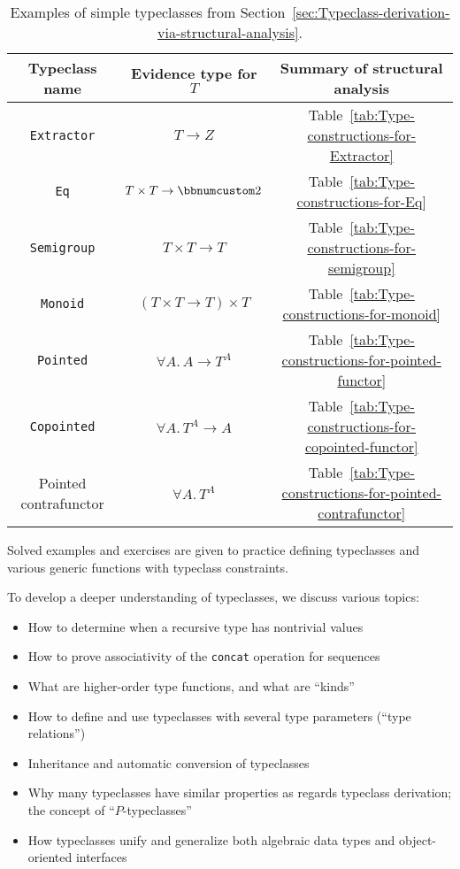 \begin{table}
\begin{centering}
\begin{tabular}{|c|c|c|}
\hline 
\textbf{\small{}Typeclass name} & \textbf{\small{}Evidence type for $T$} & \textbf{\small{}Summary of structural analysis}\tabularnewline
\hline 
\hline 
{\small{}}\lstinline!Extractor! & {\small{}$T\rightarrow Z$} & {\small{}Table~\ref{tab:Type-constructions-for-Extractor}}\tabularnewline
\hline 
{\small{}}\lstinline!Eq! & {\small{}$T\times T\rightarrow\bbnum 2$} & {\small{}Table~\ref{tab:Type-constructions-for-Eq}}\tabularnewline
\hline 
{\small{}}\lstinline!Semigroup! & {\small{}$T\times T\rightarrow T$} & {\small{}Table~\ref{tab:Type-constructions-for-semigroup}}\tabularnewline
\hline 
{\small{}}\lstinline!Monoid! & {\small{}$(T\times T\rightarrow T)\times T$} & {\small{}Table~\ref{tab:Type-constructions-for-monoid}}\tabularnewline
\hline 
{\small{}}\lstinline!Pointed! & {\small{}$\forall A.\,A\rightarrow T^{A}$} & {\small{}Table~\ref{tab:Type-constructions-for-pointed-functor}}\tabularnewline
\hline 
{\small{}}\lstinline!Copointed! & {\small{}$\forall A.\,T^{A}\rightarrow A$} & {\small{}Table~\ref{tab:Type-constructions-for-copointed-functor}}\tabularnewline
\hline 
{\small{}Pointed contrafunctor} & {\small{}$\forall A.\,T^{A}$} & {\small{}Table~\ref{tab:Type-constructions-for-pointed-contrafunctor}}\tabularnewline
\hline 
\end{tabular}
\par\end{centering}
\caption{\label{tab:Examples-of-simple-typeclasses}Examples of simple typeclasses
from Section~\ref{sec:Typeclass-derivation-via-structural-analysis}.}
\end{table}

Solved examples and exercises are given to practice defining typeclasses
and various generic functions with typeclass constraints.

To develop a deeper understanding of typeclasses, we discuss various
topics: 
\begin{itemize}
\item How to determine when a recursive type has nontrivial values
\item How to prove associativity of the \lstinline!concat! operation for
sequences
\item What are higher-order type functions, and what are \textsf{``}kinds\textsf{''}
\item How to define and use typeclasses with several type parameters (\textsf{``}type
relations\textsf{''})
\item Inheritance and automatic conversion of typeclasses
\item Why many typeclasses have similar properties as regards typeclass
derivation; the concept of \textsf{``}$P$-typeclasses\textsf{''}
\item How typeclasses unify and generalize both algebraic data types and
object-oriented interfaces
\end{itemize}

